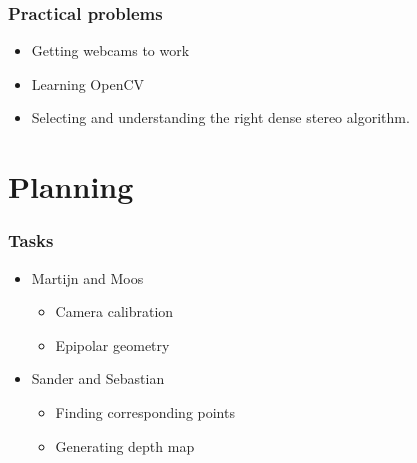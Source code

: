 \documentclass{beamer}
\begin{document}

\frame
{
  \frametitle{Practical problems}
  \begin{itemize}
   \item Getting webcams to work
   \item Learning OpenCV
   \item Selecting and understanding the right dense stereo algorithm.
  \end{itemize}
}

\section{Planning}

\frame
{
  \frametitle{Tasks}
  \begin{itemize}
    \item Martijn and Moos
    \begin{itemize}
      \item Camera calibration
      \item Epipolar geometry
    \end{itemize}
    \item Sander and Sebastian
    \begin{itemize}
      \item Finding corresponding points
      \item Generating depth map
    \end{itemize}
  \end{itemize}
}
\end{document}
